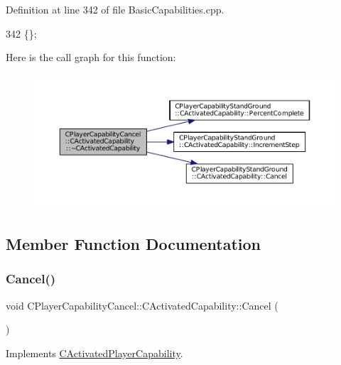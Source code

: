 Definition at line 342 of file Basic\+Capabilities.\+cpp.


\begin{DoxyCode}
342 \{\};
\end{DoxyCode}
Here is the call graph for this function\+:\nopagebreak
\begin{figure}[H]
\begin{center}
\leavevmode
\includegraphics[width=350pt]{classCPlayerCapabilityCancel_1_1CActivatedCapability_ae0d7d8f36d4ac21c04d68dc6ad2ae9c4_cgraph}
\end{center}
\end{figure}


\subsection{Member Function Documentation}
\hypertarget{classCPlayerCapabilityCancel_1_1CActivatedCapability_accd67b449574b6c99e21f522d13bc96a}{}\label{classCPlayerCapabilityCancel_1_1CActivatedCapability_accd67b449574b6c99e21f522d13bc96a} 
\subsubsection{\texorpdfstring{Cancel()}{Cancel()}}
{\footnotesize\ttfamily void C\+Player\+Capability\+Cancel\+::\+C\+Activated\+Capability\+::\+Cancel (\begin{DoxyParamCaption}{ }\end{DoxyParamCaption})\hspace{0.3cm}{\ttfamily [virtual]}}



Implements \hyperlink{classCActivatedPlayerCapability_a5cde83be468e262ad054d81e28684a81}{C\+Activated\+Player\+Capability}.



